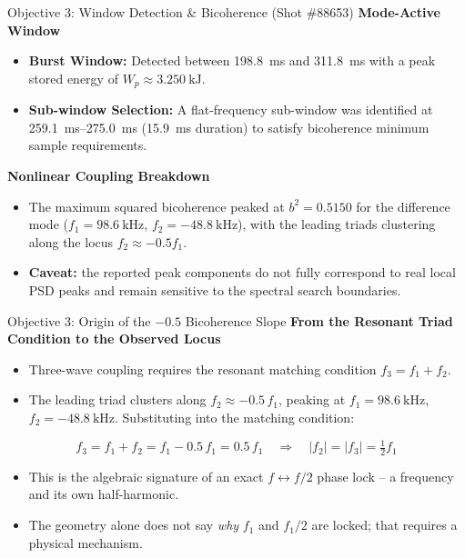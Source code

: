 \documentclass[aspectratio=169]{beamer}
\begin{document}
\begin{frame}{Objective 3: Window Detection \& Bicoherence (Shot \#88653)}
    \textbf{Mode-Active Window}
    \begin{itemize}
        \item \textbf{Burst Window:} Detected between \SI{198.8}{\milli\second} and \SI{311.8}{\milli\second} with a peak stored energy of $W_p \approx \SI{3.250}{\kilo\joule}$.
        \item \textbf{Sub-window Selection:} A flat-frequency sub-window was identified at \SI{259.1}{\milli\second}--\SI{275.0}{\milli\second} (\SI{15.9}{\milli\second} duration) to satisfy bicoherence minimum sample requirements.
    \end{itemize}
    \vspace{0.3cm}
    \textbf{Nonlinear Coupling Breakdown}
    \begin{itemize}
        \item The maximum squared bicoherence peaked at $b^2 = 0.5150$ for the difference mode ($f_1 = \SI{98.6}{\kilo\hertz}$, $f_2 = \SI{-48.8}{\kilo\hertz}$), with the leading triads clustering along the locus $f_2 \approx -0.5 f_1$.
        \item \textbf{Caveat:} the reported peak components do not fully correspond to real local PSD peaks and remain sensitive to the spectral search boundaries.
    \end{itemize}
\end{frame}

\begin{frame}{Objective 3: Origin of the $-0.5$ Bicoherence Slope}
    \textbf{From the Resonant Triad Condition to the Observed Locus}
    \begin{itemize}
        \item Three-wave coupling requires the resonant matching condition $f_3 = f_1 + f_2$.
        \item The leading triad clusters along $f_2 \approx -0.5\,f_1$, peaking at $f_1 = \SI{98.6}{\kilo\hertz}$, $f_2 = \SI{-48.8}{\kilo\hertz}$. Substituting into the matching condition:
    \end{itemize}
    \[
        f_3 = f_1 + f_2 = f_1 - 0.5\,f_1 = 0.5\,f_1
        \quad\Longrightarrow\quad
        |f_2| = |f_3| = \tfrac{1}{2}f_1
    \]
    \begin{itemize}
        \item This is the algebraic signature of an exact $f \leftrightarrow f/2$ phase lock -- a frequency and its own half-harmonic.
        \item The geometry alone does not say \emph{why} $f_1$ and $f_1/2$ are locked; that requires a physical mechanism.
    \end{itemize}
\end{frame}
\end{document}
